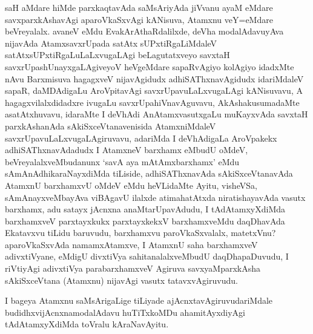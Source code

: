 \begin{artha}
saH aMdare hiMde parxkaqtavAda saMsAriyAda jiVvanu ayaM eMdare savxparxkAshavAgi aparoVkaSxvAgi kANisuva, Atamxnu veY=eMdare beVreyalalx. avaneV eMdu EvakArAthaRdalilxde, deVha modalAdavuyAva nijavAda AtamxsavxrUpada satAtx sUPxtiRgaLiMdaleV satAtxsUPxtiRgaLuLaLxvugaLAgi beLagutatxveyo savxtaH savxrUpashUnayxgaLAgiveyoV heVgeMdare sapaRvAgiyo kolAgiyo idadxMte nAvu Barxmisuva hagagxveV nijavAgidudx adhiSAThxnavAgidudx idariMdaleV sapaR, daMDAdigaLu AroVpitavAgi savxrUpavuLaLxvugaLAgi kANisuvavu, A hagagxvilalxdidadxre ivugaLu savxrUpahiVnavAguvavu, AkAshakusumadaMte asatAtxhuvavu, idaraMte I deVhAdi AnAtamxvasutxgaLu muKayxvAda savxtaH parxkAshanAda sAkiSxceVtanavenisida AtamxniMdaleV savxrUpavuLaLxvugaLAgiruvavu, adariMda I deVhAdigaLa AroVpakekx adhiSAThxnavAdadudx I AtamxneV barxhamx eMbudU oMdeV, beVreyalalxveMbudanunx `savA aya mAtAmxbarxhamx' eMdu sAmAnAdhikaraNayxdiMda tiLiside, adhiSAThxnavAda sAkiSxceVtanavAda AtamxnU barxhamxvU oMdeV eMdu heVLidaMte Ayitu, visheVSa, sAmAnayxveMbayAva viBAgavU ilalxde atimahatAtxda niratishayavAda vasutx barxhamx, adu satayx jAcnxna anaMtarUpavAdudu, I tAdAtamxyXdiMda barxhamxveV parxtayxkukx parxtayxkekxV barxhamxveMdu daqDha\-vAda Ekatavxvu tiLidu baruvudu, barxhamxvu paroVkaSxvalalx, matetxVnu?  aparoVkaSxvAda namamxAtamxve, I AtamxnU saha barxhamxveV adivxtiVyane, eMdigU divxtiVya sahitanalalxveMbudU daqDhapaDuvudu, I riVtiyAgi adivxtiVya parabarxhamxveV Agiruva savxyaMparxkAsha sAkiSxceVtana (Atamxnu) nijavAgi vasutx tatavxvAgiruvudu.
\end{artha}
\begin{artha}
I bageya Atamxnu saMsArigaLige tiLiyade ajAcnxtavAgiruvudariMdale budidhxvijAcnxnamodalAdavu huTiTxkoMDu ahamitAyxdiyAgi tAdAtamxyXdiMda toVralu kAraNavAyitu.
\end{artha}

